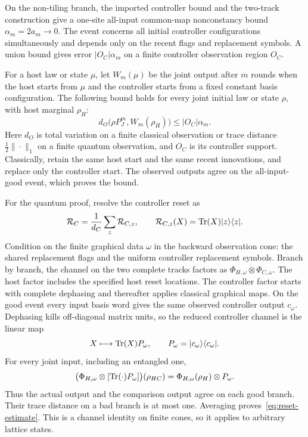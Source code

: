 On the non-tiling branch, the imported controller bound
\cite{DMforget} and the two-track construction give a one-site
all-input common-map nonconstancy bound
\(\alpha_m=2a_m\to0\).  The event concerns all initial controller
configurations simultaneously and depends only on the recent flags
and replacement symbols.  A union bound gives error
\(\lvert O_C\rvert\alpha_m\) on a finite controller observation
region \(O_C\).

For a host law or state \(\mu\), let \(W_m(\mu)\) be the joint
output after \(m\) rounds when the host starts from \(\mu\) and the
controller starts from a fixed constant basis configuration.  The
following bound holds for every joint initial law or state \(\rho\),
with host marginal \(\rho_H\):
\begin{equation}\label{eq:reset-estimate}
 d_O\bigl(\rho P_J^m,W_m(\rho_H)\bigr)
 \le \lvert O_C\rvert\alpha_m.
\end{equation}
Here \(d_O\) is total variation on a finite classical observation or
trace distance \(\tfrac12\|\cdot\|_1\) on a finite quantum
observation, and \(O_C\) is its controller support.  Classically,
retain the same host start and the same recent innovations, and
replace only the controller start.  The observed outputs agree on
the all-input-good event, which proves the bound.

For the quantum proof, resolve the controller reset as
\[
 \mathcal R_C=\frac1{d_C}\sum_z\mathcal R_{C,z},\qquad
 \mathcal R_{C,z}(X)=\operatorname{Tr}(X)|z\rangle\langle z|.
\]
Condition on the finite graphical data \(\omega\) in the backward
observation cone: the shared replacement flags and the uniform
controller replacement symbols.  Branch by branch, the channel on
the two complete tracks factors as
\(\Phi_{H,\omega}\otimes \Phi_{C,\omega}\).  The host factor includes the
specified host reset locations.  The controller factor starts with
complete dephasing and thereafter applies classical graphical maps.
On the good event every input basis word gives the same observed
controller output \(c_\omega\).  Dephasing kills off-diagonal matrix
units, so the reduced controller channel is the linear map
\[
 X\longmapsto\operatorname{Tr}(X)P_\omega,\qquad
 P_\omega=|c_\omega\rangle\langle c_\omega|.
\]
For every joint input, including an entangled one,
\[
 \bigl(\Phi_{H,\omega}\otimes[\operatorname{Tr}(\cdot)P_\omega]\bigr)(\rho_{HC})
 =\Phi_{H,\omega}(\rho_H)\otimes P_\omega.
\]
Thus the actual output and the comparison output agree on each good
branch.  Their trace distance on a bad branch is at most one.
Averaging proves~\eqref{eq:reset-estimate}.  This is a channel
identity on finite cones, so it applies to arbitrary lattice states.

